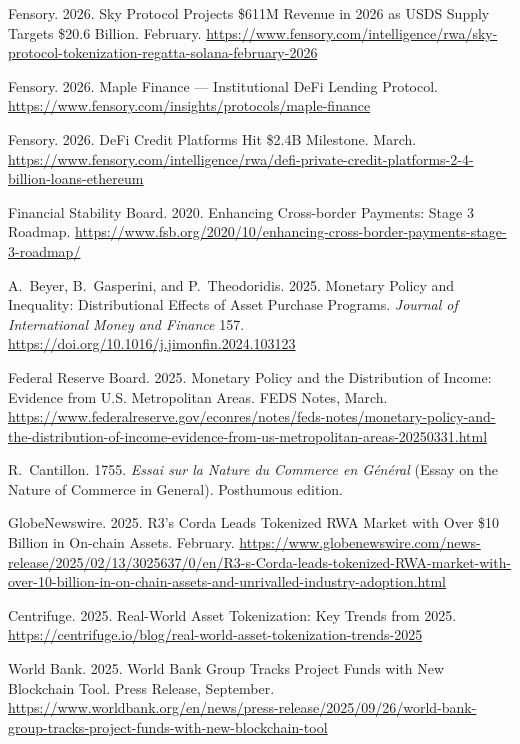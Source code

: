 \documentclass[12pt,a4paper]{report}
\begin{document}
{\begin{enumerate}[label={[\arabic*]}]
\item Fensory. 2026. Sky Protocol Projects \$611M Revenue in 2026 as USDS Supply Targets \$20.6 Billion. February. \url{https://www.fensory.com/intelligence/rwa/sky-protocol-tokenization-regatta-solana-february-2026}

\item Fensory. 2026. Maple Finance --- Institutional DeFi Lending Protocol. \url{https://www.fensory.com/insights/protocols/maple-finance}

\item Fensory. 2026. DeFi Credit Platforms Hit \$2.4B Milestone. March. \url{https://www.fensory.com/intelligence/rwa/defi-private-credit-platforms-2-4-billion-loans-ethereum}

\item Financial Stability Board. 2020. Enhancing Cross-border Payments: Stage 3 Roadmap. \url{https://www.fsb.org/2020/10/enhancing-cross-border-payments-stage-3-roadmap/}

\item A.~Beyer, B.~Gasperini, and P.~Theodoridis. 2025. Monetary Policy and Inequality: Distributional Effects of Asset Purchase Programs. \emph{Journal of International Money and Finance} 157. \url{https://doi.org/10.1016/j.jimonfin.2024.103123}

\item Federal Reserve Board. 2025. Monetary Policy and the Distribution of Income: Evidence from U.S. Metropolitan Areas. FEDS Notes, March. \url{https://www.federalreserve.gov/econres/notes/feds-notes/monetary-policy-and-the-distribution-of-income-evidence-from-us-metropolitan-areas-20250331.html}

\item R.~Cantillon. 1755. \emph{Essai sur la Nature du Commerce en G\'en\'eral} (Essay on the Nature of Commerce in General). Posthumous edition.

\item GlobeNewswire. 2025. R3's Corda Leads Tokenized RWA Market with Over \$10 Billion in On-chain Assets. February. \url{https://www.globenewswire.com/news-release/2025/02/13/3025637/0/en/R3-s-Corda-leads-tokenized-RWA-market-with-over-10-billion-in-on-chain-assets-and-unrivalled-industry-adoption.html}

\item Centrifuge. 2025. Real-World Asset Tokenization: Key Trends from 2025. \url{https://centrifuge.io/blog/real-world-asset-tokenization-trends-2025}

\item World Bank. 2025. World Bank Group Tracks Project Funds with New Blockchain Tool. Press Release, September. \url{https://www.worldbank.org/en/news/press-release/2025/09/26/world-bank-group-tracks-project-funds-with-new-blockchain-tool}


\end{enumerate}}
\end{document}

